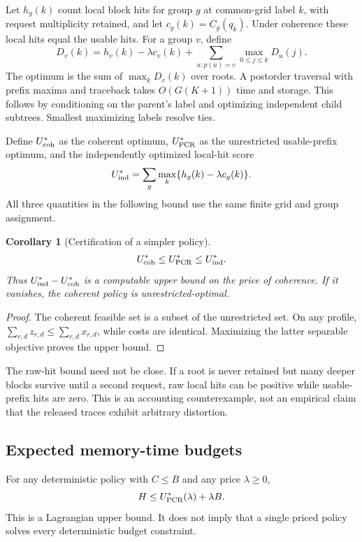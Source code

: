 \documentclass[11pt,a4paper]{article}
\newtheorem{corollary}[theorem]{Corollary}
\begin{document}
Let $h_g(k)$ count local block hits for group $g$ at common-grid label $k$, with
request multiplicity retained, and let $c_g(k)=C_g(q_k)$. Under coherence these
local hits equal the usable hits. For a group $v$, define
\begin{equation}
 D_v(k)=h_v(k)-\lambda c_v(k)
       +\sum_{u:p(u)=v}\max_{0\leq j\leq k}D_u(j).\label{eq:dp}
\end{equation}
The optimum is the sum of $\max_kD_v(k)$ over roots. A postorder traversal with
prefix maxima and traceback takes $O(G(K+1))$ time and storage. This follows by
conditioning on the parent's label and optimizing independent child subtrees.
Smallest maximizing labels resolve ties.

Define $U_{\rm coh}^*$ as the coherent optimum, $U_{\rm PCR}^*$ as the
unrestricted usable-prefix optimum, and the independently optimized local-hit
score
\begin{equation}
 U_{\rm ind}^*=\sum_g\max_k\{h_g(k)-\lambda c_g(k)\}.
\end{equation}
All three quantities in the following bound use the same finite grid and group
assignment.
\begin{corollary}[Certification of a simpler policy]\label{cor:bounds}
\begin{equation}
 U_{\rm coh}^*\leq U_{\rm PCR}^*\leq U_{\rm ind}^*.\label{eq:sandwich}
\end{equation}
Thus $U_{\rm ind}^*-U_{\rm coh}^*$ is a computable upper bound on the price of
coherence. If it vanishes, the coherent policy is unrestricted-optimal.
\end{corollary}
\begin{proof}
The coherent feasible set is a subset of the unrestricted set. On any profile,
$\sum_{r,d}z_{r,d}\leq\sum_{r,d}x_{r,d}$, while costs are identical. Maximizing
the latter separable objective proves the upper bound.
\end{proof}
The raw-hit bound need not be close. If a root is never retained but many deeper
blocks survive until a second request, raw local hits can be positive while
usable-prefix hits are zero. This is an accounting counterexample, not an
empirical claim that the released traces exhibit arbitrary distortion.

\subsection{Expected memory-time budgets}
For any deterministic policy with $C\leq B$ and any price $\lambda\geq0$,
\begin{equation}
 H\leq U_{\rm PCR}^*(\lambda)+\lambda B.\label{eq:budgetbound}
\end{equation}
This is a Lagrangian upper bound. It does not imply that a single priced policy
solves every deterministic budget constraint.
\end{document}
